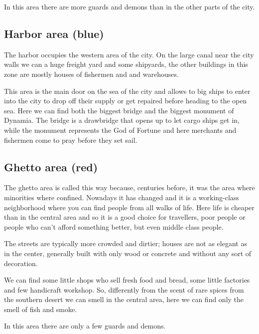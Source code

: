 In this area there are more guards and demons than in the other parts of the city.

\subsection{Harbor area (blue)}
The harbor occupies the western area of the city. On the large canal near the city walls we can a huge freight yard and some shipyards, the  other buildings in this zone are mostly houses of fishermen and and warehouses.

This area is the main door on the sea of the city and allows to big ships to enter into the city to drop off their supply or get repaired before heading to the open sea. Here we can find both the biggest bridge and the biggest monument of Dynamia. The bridge is a drawbridge that opens up to let cargo ships get in, while the monument represents the God of Fortune and here merchants and fishermen come to pray before they set sail.

\subsection{Ghetto area (red)}
The ghetto area is called this way because, centuries before, it was the area where  minorities where confined. Nowadays it has changed and it is a working-class neighborhood where you can find people from all walks of life. Here life is cheaper than in the central area and so it is a good choice for travellers, poor people or people who can't afford something better, but even middle class people.

The streets are typically more crowded and dirtier; houses are not as elegant as in the center, generally built with only wood or concrete and without any sort of decoration.

We can find some little shops who sell fresh food and bread, some little factories and few handicraft workshop. So, differently from the scent of rare spices from the southern desert we can smell in the central area, here we can find only the smell of fish and smoke.

In this area there are only a few guards and demons.
